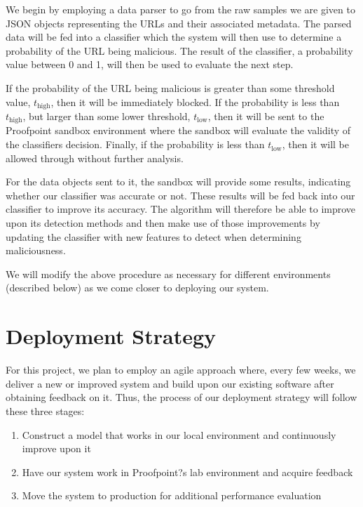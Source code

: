 \documentclass[cs,proposal]{hmcclinic}
\begin{document}
We begin by employing a data parser to go from the raw samples we are given to JSON objects representing the URLs and their associated metadata. The parsed data will be fed into a classifier which the system will then use to determine a probability of the URL being malicious. The result of the classifier, a probability value between 0 and 1, will then be used to evaluate the next step.

If the probability of the URL being malicious is greater than some threshold value, $t_{\text{high}}$, then it will be immediately blocked. If the probability is less than $t_{\text{high}}$, but larger than some lower threshold, $t_{\text{low}}$, then it will be sent to the Proofpoint sandbox environment where the sandbox will evaluate the validity of the classifiers decision. Finally, if the probability is less than $t_{\text{low}}$, then it will be allowed through without further analysis.

For the data objects sent to it, the sandbox will provide some results, indicating whether our classifier was accurate or not. These results will be fed back into our classifier to improve its accuracy. The algorithm will therefore be able to improve upon its detection methods and then make use of those improvements by updating the classifier with new features to detect when determining maliciousness.

We will modify the above procedure as necessary for different environments (described below) as we come closer to deploying our system.


\section{Deployment Strategy}

For this project, we plan to employ an agile approach where, every few weeks, we deliver a new or improved system and build upon our existing software after obtaining feedback on it. Thus, the process of our deployment strategy will follow these three stages:

\begin{enumerate} \itemsep0em
\item Construct a model that works in our local environment and continuously improve upon it
\item Have our system work in Proofpoint?s lab environment and acquire feedback
\item Move the system to production for additional performance evaluation
\end{enumerate}
\end{document}
